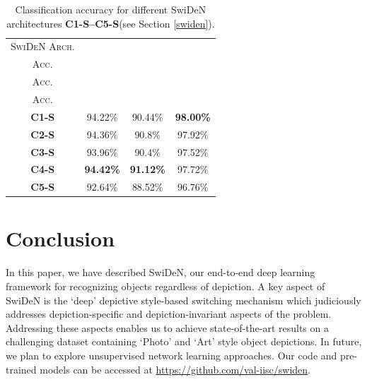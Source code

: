 \documentclass[preprint]{sig-alternate-05-2015}
\begin{document}
\renewcommand{\arraystretch}{1.5}
\begin{table}[ht]
\centering
\footnotesize
\begin{tabular}{|c|c|c|c|}
\hline
\textsc{ SwiDeN Arch.} & \thead{\textsc{Overall} \\ \textsc{Acc.}} & \thead{\textsc{Art} \\ \textsc{Acc.}} & \thead{\textsc{Photo} \\ \textsc{Acc.}} \\
\hline
\hline 
\textbf{C1-S} & 94.22\% & 90.44\% & \textbf{98.00\%} \\
\hline
\textbf{C2-S} & 94.36\% & 90.8\%  & 97.92\% \\
 \hline
\textbf{C3-S} & 93.96\% & 90.4\% & 97.52\% \\
\hline
\textbf{C4-S} & \textbf{94.42\%} & \textbf{91.12\%} & 97.72\% \\
\hline
\textbf{C5-S} & 92.64\% & 88.52\%  & 96.76\% \\ 
\hline
\end{tabular}
\caption{Classification accuracy for different SwiDeN architectures \textbf{C1-S--C5-S}(see Section \ref{swiden}).}
\label{tab:accuracy3}
\end{table}

\section{Conclusion}

In this paper, we have described SwiDeN, our end-to-end deep learning framework for recognizing objects regardless of depiction. A key aspect of SwiDeN is the `deep' depictive style-based switching mechanism which judiciously addresses  depiction-specific and depiction-invariant aspects of the problem. Addressing these aspects enables us to achieve state-of-the-art results on a challenging dataset containing `Photo' and `Art' style object depictions. In future, we plan to explore unsupervised network learning approaches. Our code and pre-trained models can be accessed at \url{https://github.com/val-iisc/swiden}.


\end{document}
